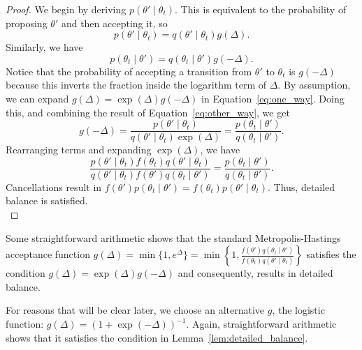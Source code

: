 \documentclass{article}
\begin{document}
\begin{proof}
We begin by deriving $p(\theta' \mid \theta_t)$. This is equivalent to the probability of proposing
$\theta'$ and then accepting it, so
\begin{equation}\label{eq:one_way}
p(\theta' \mid \theta_t) = q(\theta' \mid \theta_t)g(\Delta).
\end{equation}
Similarly, we have
\begin{equation}\label{eq:other_way}
p(\theta_t \mid \theta') = q(\theta_t \mid \theta')g(-\Delta).
\end{equation}
Notice that the probability of accepting a transition from $\theta'$ to $\theta_t$ is $g(-\Delta)$
because this inverts the fraction inside the logarithm term of $\Delta$.  By assumption, we can
expand $g(\Delta) = \exp(\Delta)g(-\Delta)$ in Equation~\ref{eq:one_way}.  Doing this, and combining
the result of Equation~\ref{eq:other_way}, we get
\begin{equation}\label{eq:combined}
g(-\Delta) = \frac{p(\theta' \mid \theta_t)}{q(\theta' \mid \theta_t)\exp(\Delta)} = \frac{p(\theta_t \mid \theta')}{q(\theta_t \mid \theta')}.
\end{equation}
Rearranging terms and expanding $\exp(\Delta)$, we have
\begin{equation}\label{eq:rearrange}
\frac{p(\theta' \mid \theta_t) f(\theta_t) q(\theta' \mid \theta_t)}{q(\theta' \mid \theta_t) f(\theta') q(\theta_t \mid \theta')} = \frac{p(\theta_t \mid \theta')}{ q(\theta_t \mid \theta')}.
\end{equation}
Cancellations result in $f(\theta') p(\theta_t \mid \theta') = f(\theta_t) p(\theta' \mid \theta_t)$. Thus, detailed balance is satisfied.\\
\end{proof}

Some straightforward arithmetic shows that the standard Metropolis-Hastings acceptance function
$g(\Delta) = \min\{1, e^\Delta \} = \min\left\{1, \frac{f(\theta')q(\theta_t \mid \theta')}{f(\theta_t)q(\theta' \mid
\theta_t)}\right\}$ satisfies the condition $g(\Delta) =
\exp(\Delta)g(-\Delta)$ and consequently, results in detailed balance.

For reasons that will be clear later, we choose an alternative $g$, the logistic function:
$g(\Delta) = (1+\exp(-\Delta))^{-1}$. Again, straightforward arithmetic shows that it satisfies the
condition in Lemma~\ref{lem:detailed_balance}.
\end{document}
